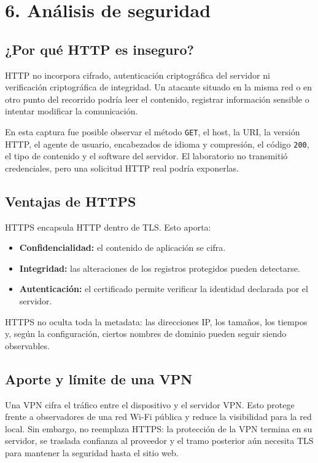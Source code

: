 \documentclass[11pt,a4paper]{article}
\newcommand{\reportpage}{%
  \clearpage
  \thispagestyle{fancy}}
\begin{document}
\reportpage
\section*{6. Análisis de seguridad}

\subsection*{¿Por qué HTTP es inseguro?}

HTTP no incorpora cifrado, autenticación criptográfica del servidor ni verificación criptográfica de integridad. Un atacante situado en la misma red o en otro punto del recorrido podría leer el contenido, registrar información sensible o intentar modificar la comunicación.

En esta captura fue posible observar el método \texttt{GET}, el host, la URI, la versión HTTP, el agente de usuario, encabezados de idioma y compresión, el código \texttt{200}, el tipo de contenido y el software del servidor. El laboratorio no transmitió credenciales, pero una solicitud HTTP real podría exponerlas.

\subsection*{Ventajas de HTTPS}

HTTPS encapsula HTTP dentro de TLS. Esto aporta:

\begin{itemize}
  \item \textbf{Confidencialidad:} el contenido de aplicación se cifra.
  \item \textbf{Integridad:} las alteraciones de los registros protegidos pueden detectarse.
  \item \textbf{Autenticación:} el certificado permite verificar la identidad declarada por el servidor.
\end{itemize}

HTTPS no oculta toda la metadata: las direcciones IP, los tamaños, los tiempos y, según la configuración, ciertos nombres de dominio pueden seguir siendo observables.

\subsection*{Aporte y límite de una VPN}

Una VPN cifra el tráfico entre el dispositivo y el servidor VPN. Esto protege frente a observadores de una red Wi-Fi pública y reduce la visibilidad para la red local. Sin embargo, no reemplaza HTTPS: la protección de la VPN termina en su servidor, se traslada confianza al proveedor y el tramo posterior aún necesita TLS para mantener la seguridad hasta el sitio web.
\end{document}
